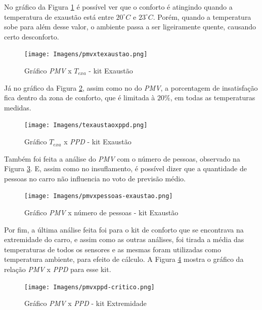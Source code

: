 \documentclass[acronym,symbols,table]{fei}
\begin{document}
No gráfico da Figura \ref{fig:texasutaoxpmv} é possível ver que o conforto é atingindo quando a temperatura de exaustão está entre $20^\circ C$ e $23^\circ C$. Porém, quando a temperatura sobe para além desse valor, o ambiente passa a ser ligeiramente quente, causando certo desconforto.

\begin{figure}[!htb]
    \centering
    \caption{Gráfico \textit{PMV} x $T_{exa}$ - kit Exaustão}
    \texttt{[image: Imagens/pmvxtexaustao.png]}
    \label{fig:texasutaoxpmv}
\end{figure}
\newpage
Já no gráfico da Figura \ref{fig:texaustaoxppd}, assim como no do \textit{PMV}, a porcentagem de insatisfação fica dentro da zona de conforto, que é limitada à $20\%$, em todas as temperaturas medidas.

\begin{figure}[!htb]
    \centering
    \caption{Gráfico $T_{exa}$ x \textit{PPD} - kit Exaustão}
    \texttt{[image: Imagens/texaustaoxppd.png]}
    \label{fig:texaustaoxppd}
\end{figure}
		
Também foi feita a análise do \textit{PMV} com o número de pessoas, observado na Figura \ref{fig:pmvxpessoas-exaustao}. E, assim como no insuflamento, é possível dizer que a quantidade de pessoas no carro não influencia no voto de previsão médio.

\begin{figure}[!htb]
    \centering
    \caption{Gráfico \textit{PMV} x número de pessoas - kit Exaustão}
    \texttt{[image: Imagens/pmvxpessoas-exaustao.png]}
    \label{fig:pmvxpessoas-exaustao}
\end{figure}


Por fim, a última análise feita foi para o kit de conforto que se encontrava na extremidade do carro, e assim como as outras análises, foi tirada a média das temperaturas de todos os sensores e as mesmas foram utilizadas como temperatura ambiente, para efeito de cálculo. A Figura \ref{fig:pmv-ppd-critico} mostra o gráfico da relação \textit{PMV} x \textit{PPD} para esse kit. 

\begin{figure}[!htb]
    \centering
    \caption{Gráfico \textit{PMV} x \textit{PPD} - kit Extremidade}
    \texttt{[image: Imagens/pmvxppd-critico.png]}
    \label{fig:pmv-ppd-critico}
\end{figure}
\end{document}
